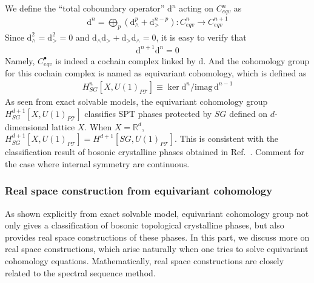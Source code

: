 \documentclass[reprint,amsmath,amssymb,aps,pra,]{revtex4-1}
\newcommand{\dd}{\mathrm{d}} %
\newcommand{\TT}{\mathcal{T}} %
\newcommand{\imag}{\mathrm{imag}}
\begin{document}
We define the ``total coboundary operator'' $\dd^{n}$ acting on $C^{n}_{eqv}$ as
\begin{align}
  \dd^n=\bigoplus_p(\dd_\wedge^p+\dd_>^{n-p}):C^{n}_{eqv}\rightarrow C^{n+1}_{eqv}
  \label{}
\end{align}
Since $\dd_\wedge^2=\dd_>^2=0$ and $\dd_\wedge\dd_>+\dd_>\dd_\wedge=0$, it is easy to verify that
\begin{align}
  \dd^{n+1}\dd^n=0
  \label{}
\end{align}
Namely, $C^{\bullet}_{eqv}$ is indeed a cochain complex linked by $\dd$.
And the cohomology group for this cochain complex is named as equivariant cohomology, which is defined as
\begin{align}
  H^{n}_{SG}[X,U(1)_{P\TT}]\equiv\ker \dd^n/\imag\,\dd^{n-1}
  \label{}
\end{align}
As seen from exact solvable models, the equivariant cohomology group $H^{d+1}_{SG}[X,U(1)_{P\TT}]$ classifies SPT phases protected by $SG$ defined on $d$-dimensional lattice $X$.
When $X=\mathbb{R}^d$, $H^{d+1}_{SG}[X,U(1)_{P\TT}]=H^{d+1}[SG,U(1)_{P\TT}]$\cite{Brown2012cohomology}.
This is consistent with the classification result of bosonic crystalline phases obtained in Ref.~.
{\color{red} Comment for the case where internal symmetry are continuous.}

\subsubsection{Real space construction from equivariant cohomology}
As shown explicitly from exact solvable model, equivariant cohomology group not only gives a classification of bosonic topological crystalline phases, but also provides real space constructions of these phases.
In this part, we discuss more on real space constructions, which arise naturally when one tries to solve equivariant cohomology equations.
Mathematically, real space constructions are closely related to the spectral sequence method.
\end{document}
